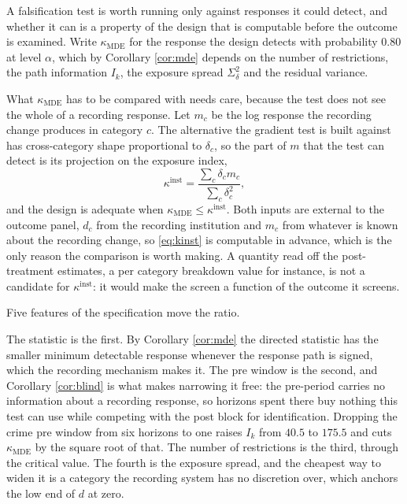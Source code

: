 \documentclass[12pt]{article}
\theoremstyle{definition}
\numberwithin{equation}{section}
\begin{document}
A falsification test is worth running only against responses it could detect,
and whether it can is a property of the design that is computable before the
outcome is examined. Write $\kappa_{\mathrm{MDE}}$ for the response the design
detects with probability $0.80$ at level $\alpha$, which by Corollary
\ref{cor:mde} depends on the number of restrictions, the path information
$I_k$, the exposure spread $\Sigma_\delta^2$ and the residual variance.

What $\kappa_{\mathrm{MDE}}$ has to be compared with needs care, because the
test does not see the whole of a recording response. Let $m_c$ be the log
response the recording change produces in category $c$. The alternative the
gradient test is built against has cross-category shape proportional to
$\delta_c$, so the part of $m$ that the test can detect is its projection on the
exposure index,
\begin{equation}
\kappa^{\mathrm{inst}} = \frac{\sum_c \delta_c m_c}{\sum_c \delta_c^2} ,
\label{eq:kinst}
\end{equation}
and the design is adequate when $\kappa_{\mathrm{MDE}} \le
\kappa^{\mathrm{inst}}$. Both inputs are external to the outcome panel, $d_c$
from the recording institution and $m_c$ from whatever is known about the
recording change, so \eqref{eq:kinst} is computable in advance, which is the
only reason the comparison is worth making. A quantity read off the
post-treatment estimates, a per category breakdown value for instance, is not a
candidate for $\kappa^{\mathrm{inst}}$: it would make the screen a function of
the outcome it screens.

Five features of the specification move the ratio.

The statistic is the first. By Corollary \ref{cor:mde} the directed statistic
has the smaller minimum detectable response whenever the response path is
signed, which the recording mechanism makes it. The pre window is the second,
and Corollary \ref{cor:blind} is what makes narrowing it free: the pre-period carries no information about a recording response, so horizons spent there buy
nothing this test can use while competing with the post block for
identification. Dropping the crime pre window from six horizons to one raises
$I_k$ from $40.5$ to $175.5$ and cuts $\kappa_{\mathrm{MDE}}$ by the square root
of that. The number of restrictions is the third, through the critical value.
The fourth is the exposure spread, and the cheapest way to widen it is a
category the recording system has no discretion over, which anchors the low end
of $d$ at zero.
\end{document}
